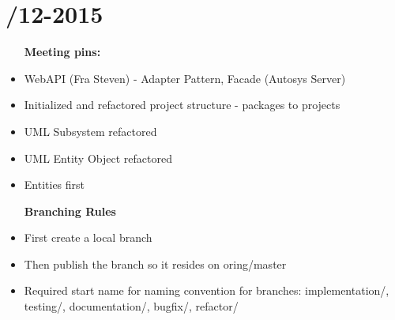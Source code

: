 \section{/12-2015} %
\attend{\at}{\at}{\at}{\at}


\begin{itemize}
	\item [\textbf{Meeting pins:}]
	\item WebAPI (Fra Steven) - Adapter Pattern, Facade (Autosys Server)
	\item Initialized and refactored project structure - packages to projects
	\item UML Subsystem refactored
	\item UML Entity Object refactored
	\item Entities first
\end{itemize}

\begin{itemize}
	\item [\textbf{Branching Rules}]
	\item First create a local branch
	\item Then publish the branch so it resides on oring/master
	\item Required start name for naming convention for branches: implementation/, testing/, documentation/, bugfix/, refactor/
\end{itemize}